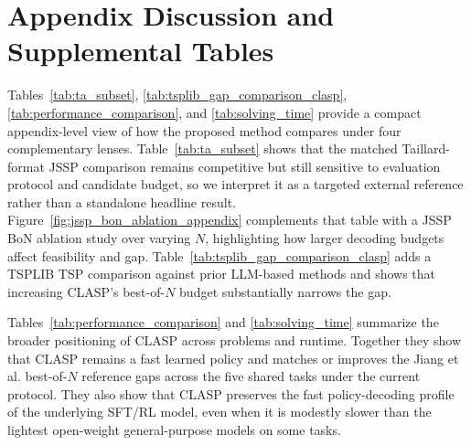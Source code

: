 \documentclass{article}
\theoremstyle{remark}
\begin{document}
\FloatBarrier
\section{Appendix Discussion and Supplemental Tables}
\label{app:appendix_discussion}
Tables~\ref{tab:ta_subset}, \ref{tab:tsplib_gap_comparison_clasp}, \ref{tab:performance_comparison}, and \ref{tab:solving_time} provide a compact appendix-level view of how the proposed method compares under four complementary lenses. Table~\ref{tab:ta_subset} shows that the matched Taillard-format JSSP comparison remains competitive but still sensitive to evaluation protocol and candidate budget, so we interpret it as a targeted external reference rather than a standalone headline result. Figure~\ref{fig:jssp_bon_ablation_appendix} complements that table with a JSSP BoN ablation study over varying \(N\), highlighting how larger decoding budgets affect feasibility and gap. Table~\ref{tab:tsplib_gap_comparison_clasp} adds a TSPLIB TSP comparison against prior LLM-based methods and shows that increasing CLASP's best-of-\(N\) budget substantially narrows the gap.

Tables~\ref{tab:performance_comparison} and \ref{tab:solving_time} summarize the broader positioning of CLASP across problems and runtime. Together they show that CLASP remains a fast learned policy and matches or improves the Jiang et al. best-of-\(N\) reference gaps across the five shared tasks under the current protocol. They also show that CLASP preserves the fast policy-decoding profile of the underlying SFT/RL model, even when it is modestly slower than the lightest open-weight general-purpose models on some tasks.
\end{document}
